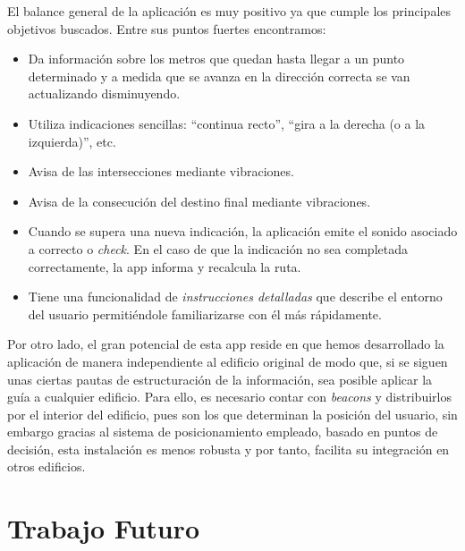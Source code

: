 El balance general de la aplicación es muy positivo ya que cumple los principales objetivos buscados. Entre sus puntos fuertes encontramos:
\begin{itemize}
	\item Da información sobre los metros que quedan hasta llegar a un punto determinado y a medida que se avanza en la dirección correcta se van actualizando disminuyendo.
	\item Utiliza indicaciones sencillas: ``continua recto'', ``gira a la derecha (o a la izquierda)'', etc.
	\item Avisa de las intersecciones mediante vibraciones.
	\item Avisa de la consecución del destino final mediante vibraciones.
	\item Cuando se supera una nueva indicación, la aplicación emite el sonido asociado a correcto o \textit{check}. En el caso de que la indicación no sea completada correctamente, la app informa y recalcula la ruta.
	\item Tiene una funcionalidad de \textit{instrucciones detalladas} que describe el entorno del usuario permitiéndole familiarizarse con él más rápidamente.
\end{itemize}

Por otro lado, el gran potencial de esta app reside en que hemos desarrollado la aplicación de manera independiente al edificio original de modo que, si se siguen unas ciertas pautas de estructuración de la información, sea posible aplicar la guía a cualquier edificio. Para ello, es necesario contar con \textit{beacons} y distribuirlos por el interior del edificio, pues son los que determinan la posición del usuario, sin embargo gracias al sistema de posicionamiento empleado, basado en puntos de decisión, esta instalación es menos robusta y por tanto, facilita su integración en otros edificios. 

\section{Trabajo Futuro}

